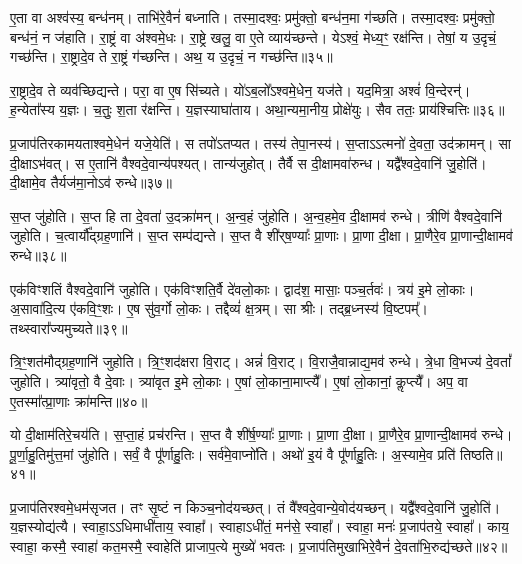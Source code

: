 ए॒ता वा अश्व॑स्य॒ बन्ध॑नम्।
ताभि॑रे॒वैनं॑ बध्नाति।
तस्मा॒दश्वः॒ प्रमु॑क्तो॒ बन्ध॑न॒मा ग॑च्छति।
तस्मा॒दश्वः॒ प्रमु॑क्तो॒ बन्ध॑नं॒ न ज॑हाति।
रा॒ष्ट्रं वा अ॑श्वमे॒धः।
रा॒ष्ट्रे खलु॒ वा ए॒ते व्याय॑च्छन्ते।
येऽश्वं॒ मेध्य॒ꣳ॒ रक्ष॑न्ति।
तेषां॒ य उ॒दृचं॒ गच्छ॑न्ति।
रा॒ष्ट्रादे॒व ते रा॒ष्ट्रं ग॑च्छन्ति।
अथ॒ य उ॒दृचं॒ न गच्छ॑न्ति॥३५॥\ip

रा॒ष्ट्रादे॒व ते व्यव॑च्छिद्यन्ते।
परा॒ वा ए॒ष सि॑च्यते।
यो॑ऽब॒लो᳚\-ऽश्वमे॒धेन॒ यज॑ते।
यद॒मित्रा॒ अश्वं॑ वि॒न्देरन्॑।
ह॒न्येता᳚स्य य॒ज्ञः।
च॒तुः॒ श॒ता र॑क्षन्ति।
य॒ज्ञस्याघा॑ताय।
अथा॒न्यमा॒नीय॒ प्रोक्षे॑युः।
सैव ततः॒ प्राय॑श्चित्तिः॥३६॥\ip\anuvakamend[ग॒च्छ॒ति॒ भ॒व॒तः॒ प॒थ्सु जु॑होति॒ न गच्छ॑न्ति॒ नव॑ च]

प्र॒जा\-प॑तिरकामयताश्वमे॒धेन॑ यजे॒येति॑।
स तपो॑\-ऽतप्यत।
तस्य॑ तेपा॒नस्य॑।
स॒प्ताऽऽत्मनो॑ दे॒वता॒ उद॑क्रामन्।
सा दी॒क्षा\-ऽभ॑वत्।
स ए॒तानि॑ वैश्वदे॒वान्य॑पश्यत्।
तान्य॑जुहोत्।
तैर्वै स दी॒क्षामवा॑रुन्ध।
यद्वै᳚श्वदे॒वानि॑ जु॒होति॑।
दी॒क्षामे॒व तैर्यज॑मा॒नोऽव॑ रुन्धे॥३७॥\ip

स॒प्त जु॑होति।
स॒प्त हि ता दे॒वता॑ उ॒दक्रा॑मन्।
अ॒न्व॒हं जु॑होति।
अ॒न्व॒हमे॒व दी॒क्षामव॑ रुन्धे।
त्रीणि॑ वैश्वदे॒वानि॑ जुहोति।
च॒त्वार्यौ᳚द्ग्रह॒णानि॑।
स॒प्त सम्प॑द्यन्ते।
स॒प्त वै शी॑र्‌\mbox{}ष॒ण्याः᳚ प्रा॒णाः।
प्रा॒णा दी॒क्षा।
प्रा॒णैरे॒व प्रा॒णान्दी॒क्षामव॑ रुन्धे॥३८॥\ip

एक॑विꣳशतिं वैश्वदे॒वानि॑ जुहोति।
एक॑विꣳशति॒र्वै दे॑वलो॒काः।
द्वाद॑श॒ मासाः॒ पञ्च॒र्तवः॑।
त्रय॑ इ॒मे लो॒काः।
अ॒सावा॑दि॒त्य ए॑कवि॒ꣳ॒शः।
ए॒ष सु॑व॒र्गो लो॒कः।
तद्दैव्यं॑ क्ष॒त्रम्।
सा श्रीः।
तद्ब्र॒ध्नस्य॑ वि॒ष्टपम्᳚।
तथ्स्वारा᳚ज्यमुच्यते॥३९॥\ip

त्रि॒ꣳ॒शत॑मौद्ग्रह॒णानि॑ जुहोति।
त्रि॒ꣳ॒शद॑क्षरा वि॒राट्।
अन्नं॑ वि॒राट्।
वि॒राजै॒वान्नाद्य॒मव॑ रुन्धे।
त्रे॒धा वि॒भज्य॑ दे॒वतां᳚ जुहोति।
त्र्या॑वृतो॒ वै दे॒वाः।
त्र्या॑वृत इ॒मे लो॒काः।
ए॒षां लो॒काना॒माप्त्यै᳚।
ए॒षां लो॒कानां॒ कॢप्त्यै᳚।
अप॒ वा ए॒तस्मा᳚त्प्रा॒णाः क्रा॑मन्ति॥४०॥\ip

यो दी॒क्षाम॑तिरे॒चय॑ति।
स॒प्ता॒हं प्रच॑रन्ति।
स॒प्त वै शी॑र्\mbox{}ष॒ण्याः᳚ प्रा॒णाः।
प्रा॒णा दी॒क्षा।
प्रा॒णैरे॒व प्रा॒णान्दी॒क्षामव॑ रुन्धे।
पू॒र्णा॒हु॒तिमु॑त्त॒मां जु॑होति।
सर्वं॒ वै पू᳚र्णाहु॒तिः।
सर्व॑\-मे॒वा\-प्नो॑ति।
अथो॑ इ॒यं वै पू᳚र्णाहु॒तिः।
अ॒स्यामे॒व प्रति॑ तिष्ठति॥४१॥\ip\anuvakamend[रु॒न्धे॒ प्रा॒णान्दी॒क्षामव॑ रुन्ध उच्यते क्रामन्ति तिष्ठति]

प्र॒जा\-प॑तिरश्वमे॒धम॑\-सृजत।
तꣳ सृ॒ष्टं न किञ्च॒नोद॑यच्छत्।
तं वै᳚श्वदे॒वान्ये॒वोद॑यच्छन्।
यद्वै᳚श्वदे॒वानि॑ जु॒होति॑।
य॒ज्ञस्योद्य॑त्यै।
स्वाहा॒\-ऽऽधिमाधी॑ताय॒ स्वाहा᳚।
स्वाहा\-ऽधी॑तं॒ मन॑से॒ स्वाहा᳚।
स्वाहा॒ मनः॑ प्र॒जा\-प॑तये॒ स्वाहा᳚।
काय॒ स्वाहा॒ कस्मै॒ स्वाहा॑ कत॒मस्मै॒ स्वाहेति॑ प्राजाप॒त्ये मुख्ये॑ भवतः।
प्र॒जा\-प॑तिमुखाभिरे॒वैनं॑ दे॒वता॑भि॒रुद्य॑च्छते॥४२॥\ip

